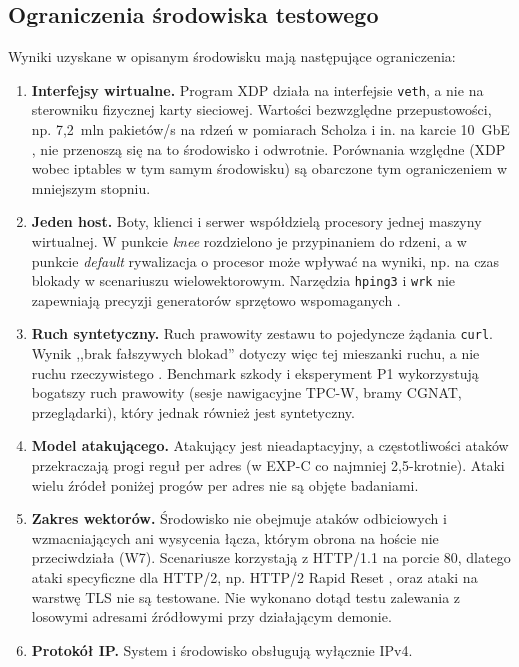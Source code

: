 \documentclass[a4paper,12pt]{article}
\begin{document}
\subsection{Ograniczenia środowiska testowego}\label{sec:ograniczenia}
Wyniki uzyskane w opisanym środowisku mają następujące ograniczenia:
\begin{enumerate}
    \item \textbf{Interfejsy wirtualne.} Program XDP działa na interfejsie \texttt{veth}, a nie na sterowniku fizycznej karty sieciowej. Wartości bezwzględne przepustowości, np. 7,2~mln pakietów/s na rdzeń w pomiarach Scholza i in. na karcie 10~GbE \cite{scholz2018performance}, nie przenoszą się na to środowisko i odwrotnie. Porównania względne (XDP wobec iptables w tym samym środowisku) są obarczone tym ograniczeniem w mniejszym stopniu.
    \item \textbf{Jeden host.} Boty, klienci i serwer współdzielą procesory jednej maszyny wirtualnej. W punkcie \textit{knee} rozdzielono je przypinaniem do rdzeni, a w punkcie \textit{default} rywalizacja o procesor może wpływać na wyniki, np. na czas blokady w scenariuszu wielowektorowym. Narzędzia \texttt{hping3} i \texttt{wrk} nie zapewniają precyzji generatorów sprzętowo wspomaganych \cite{emmerich2015moongen}.
    \item \textbf{Ruch syntetyczny.} Ruch prawowity zestawu to pojedyncze żądania \texttt{curl}. Wynik ,,brak fałszywych blokad'' dotyczy więc tej mieszanki ruchu, a nie ruchu rzeczywistego \cite{kostopoulos2026ebpf}. Benchmark szkody i eksperyment P1 wykorzystują bogatszy ruch prawowity (sesje nawigacyjne TPC-W, bramy CGNAT, przeglądarki), który jednak również jest syntetyczny.
    \item \textbf{Model atakującego.} Atakujący jest nieadaptacyjny, a częstotliwości ataków przekraczają progi reguł per adres (w EXP-C co najmniej 2,5-krotnie). Ataki wielu źródeł poniżej progów per adres nie są objęte badaniami.
    \item \textbf{Zakres wektorów.} Środowisko nie obejmuje ataków odbiciowych i wzmacniających ani wysycenia łącza, którym obrona na hoście nie przeciwdziała (W7). Scenariusze korzystają z HTTP/1.1 na porcie 80, dlatego ataki specyficzne dla HTTP/2, np. HTTP/2 Rapid Reset \cite{pardue2023rapidreset, nvd2023cve44487}, oraz ataki na warstwę TLS nie są testowane. Nie wykonano dotąd testu zalewania z losowymi adresami źródłowymi przy działającym demonie.
    \item \textbf{Protokół IP.} System i środowisko obsługują wyłącznie IPv4.
\end{enumerate}
\end{document}
